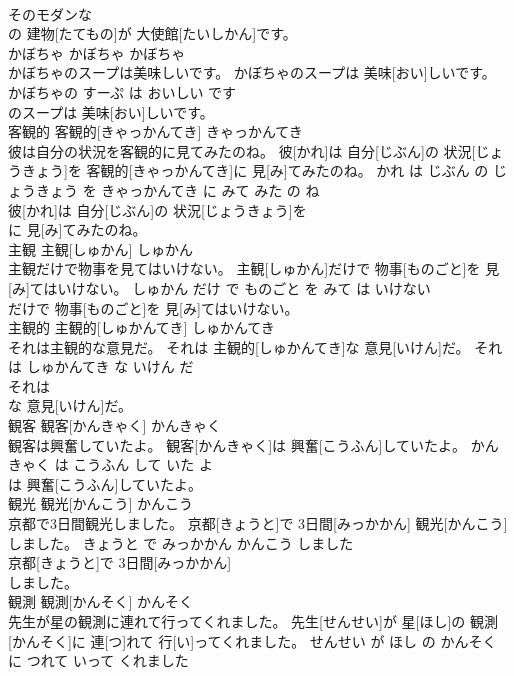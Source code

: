 \documentclass[8pt]{extreport}
\begin{document}
\begin{CJK}{UTF8}{min}
\\	そのモダンな
\\	の 建物[たてもの]が 大使館[たいしかん]です。			
\\	かぼちゃ	かぼちゃ	かぼちゃ	
\\	かぼちゃのスープは美味しいです。	かぼちゃのスープは 美味[おい]しいです。	かぼちゃの すーぷ は おいしい です	
\\	のスープは 美味[おい]しいです。			
\\	客観的	客観的[きゃっかんてき]	きゃっかんてき	
\\	彼は自分の状況を客観的に見てみたのね。	彼[かれ]は 自分[じぶん]の 状況[じょうきょう]を 客観的[きゃっかんてき]に 見[み]てみたのね。	かれ は じぶん の じょうきょう を きゃっかんてき に みて みた の ね	
\\	彼[かれ]は 自分[じぶん]の 状況[じょうきょう]を
\\	に 見[み]てみたのね。			
\\	主観	主観[しゅかん]	しゅかん	
\\	主観だけで物事を見てはいけない。	主観[しゅかん]だけで 物事[ものごと]を 見[み]てはいけない。	しゅかん だけ で ものごと を みて は いけない	
\\	だけで 物事[ものごと]を 見[み]てはいけない。			
\\	主観的	主観的[しゅかんてき]	しゅかんてき	
\\	それは主観的な意見だ。	それは 主観的[しゅかんてき]な 意見[いけん]だ。	それ は しゅかんてき な いけん だ	
\\	それは
\\	な 意見[いけん]だ。			
\\	観客	観客[かんきゃく]	かんきゃく	
\\	観客は興奮していたよ。	観客[かんきゃく]は 興奮[こうふん]していたよ。	かんきゃく は こうふん して いた よ	
\\	は 興奮[こうふん]していたよ。			
\\	観光	観光[かんこう]	かんこう	
\\	京都で3日間観光しました。	京都[きょうと]で 3日間[みっかかん] 観光[かんこう]しました。	きょうと で みっかかん かんこう しました	
\\	京都[きょうと]で 3日間[みっかかん]
\\	しました。			
\\	観測	観測[かんそく]	かんそく	
\\	先生が星の観測に連れて行ってくれました。	先生[せんせい]が 星[ほし]の 観測[かんそく]に 連[つ]れて 行[い]ってくれました。	せんせい が ほし の かんそく に つれて いって くれました	

\end{CJK}
\end{document}
